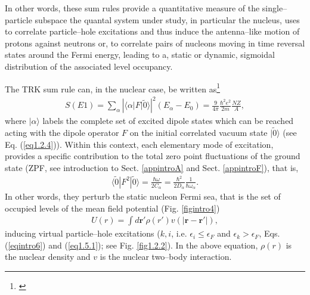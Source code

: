 In other words, these sum rules provide a quantitative measure of the single--particle subspace the quantal system under study, in particular the nucleus, uses to correlate particle--hole excitations and thus induce the antenna--like motion of protons against neutrons or, to correlate pairs of nucleons moving in time reversal states around the Fermi energy, leading to a, static or dynamic, sigmoidal distribution of the associated level occupancy. 


The TRK sum rule can, in the nuclear case, be written as\footnote{\cite{Bohr:75,Bertsch:05,Bortignon:98}}
\begin{align}\label{eq_intro1}
S(E1)=\sum_\alpha\left|\langle\alpha|F|\tilde 0\rangle\right|^2(E_\alpha-E_0)=\frac{9}{4\pi}\frac{\hbar^2e^2}{2m}\frac{NZ}{A},
\end{align}
where $|\alpha\rangle$ labels the complete set of excited dipole states which can be reached acting with the dipole operator $F$ on the initial correlated vacuum state $|\tilde 0\rangle$ (see Eq. (\ref{eq1.2.4})). Within this context, each elementary mode of excitation, provides a specific contribution to the total zero point fluctuations of the ground state (ZPF, see introduction to Sect. \ref{appintroA} and Sect. \ref{appintroF}), that is,
\begin{align}\label{eqintro2}
\langle\tilde 0|F^2|\tilde 0\rangle=\frac{\hbar \omega}{2C_\alpha}=\frac{\hbar^2}{2D_\alpha}\frac{1}{\hbar\omega_\alpha}.
\end{align}
In other words, they perturb the static nucleon Fermi sea, that is the set of occupied levels of the mean field potential (Fig. \ref{figintro4})
\begin{align}\label{eqintro3}
U(r)=\int d\mathbf r' \rho(r')v(|\mathbf r-\mathbf r'|),
\end{align}
inducing virtual particle--hole excitations ($k,i$, i.e. $\epsilon_i\leq\epsilon_F$ and $\epsilon_k>\epsilon_F$,  Eqs. (\ref{eqintro6}) and (\ref{eq1.5.1}); see Fig. \ref{fig1.2.2}). In the above equation, $\rho(r)$ is the nuclear density and $v$ is the nuclear two--body interaction.  


